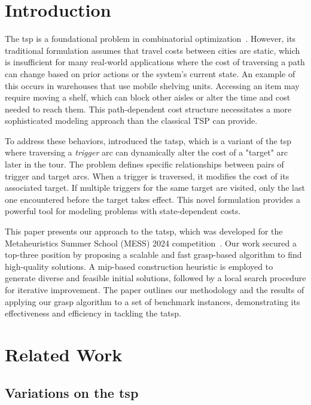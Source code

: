 \documentclass[twocolumn, switch]{article} %
\begin{document}
\section{Introduction}
The \gls{tsp} is a foundational problem in combinatorial optimization~\cite{Applegate2011}. 
However, its traditional formulation assumes that travel costs between cities are static, which is insufficient for many real-world applications where the cost of traversing a path can change based on prior actions or the system's current state.
An example of this occurs in warehouses that use mobile shelving units. Accessing an item may require moving a shelf, which can block other aisles or alter the time and cost needed to reach them. This path-dependent cost structure necessitates a more sophisticated modeling approach than the classical TSP can provide.

To address these behaviors, \citet{Cerrone} introduced the \gls{tatsp}, which is a variant of the \gls{tsp} where traversing a \textit{trigger} arc can dynamically alter the cost of a "target" arc later in the tour. 
The problem defines specific relationships between pairs of trigger and target arcs. 
When a trigger is traversed, it modifies the cost of its associated target. 
If multiple triggers for the same target are visited, only the last one encountered before the target takes effect. 
This novel formulation provides a powerful tool for modeling problems with state-dependent costs.

This paper presents our approach to the \gls{tatsp}, which was developed for the Metaheuristics Summer School (MESS) 2024 competition~\cite{mess2024}. 
Our work secured a top-three position by proposing a scalable and fast \gls{grasp}-based algorithm to find high-quality solutions. 
A \gls{mip}-based construction heuristic is employed to generate diverse and feasible initial solutions, followed by a local search procedure for iterative improvement.
The paper outlines our methodology and the results of applying our \gls{grasp} algorithm to a set of benchmark instances, demonstrating its effectiveness and efficiency in tackling the \gls{tatsp}.

\section{Related Work}
\label{sec:related_work}

\subsection{Variations on the \gls{tsp}}
\end{document}
